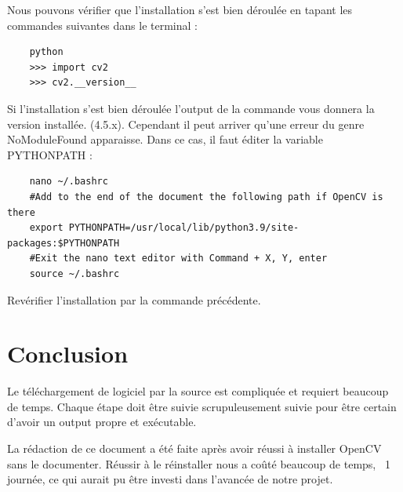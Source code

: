 \documentclass[
	a4paper,									%
	11pt,										%
	twoside,									%
	openright,									%
	notitlepage,									%
	parskip=half,								%
]{scrreprt}										%
\begin{document}
Nous pouvons vérifier que l'installation s'est bien déroulée en tapant les commandes suivantes dans le terminal : 

\begin{verbatim}
	python
	>>> import cv2
	>>> cv2.__version__
\end{verbatim}

Si l'installation s'est bien déroulée l'output de la commande vous donnera la version installée. (4.5.x). Cependant
il peut arriver qu'une erreur du genre NoModuleFound apparaisse. Dans ce cas, il faut éditer la variable PYTHONPATH : 

\begin{verbatim}
	nano ~/.bashrc
	#Add to the end of the document the following path if OpenCV is there
	export PYTHONPATH=/usr/local/lib/python3.9/site-packages:$PYTHONPATH
	#Exit the nano text editor with Command + X, Y, enter
	source ~/.bashrc
\end{verbatim}

Revérifier l'installation par la commande précédente.

\chapter{Conclusion}

Le téléchargement de logiciel par la source est compliquée et requiert beaucoup de temps. Chaque étape doit être
suivie scrupuleusement suivie pour être certain d'avoir un output propre et exécutable. \par

La rédaction de ce document a été faite après avoir réussi à installer OpenCV sans le documenter. 
Réussir à le réinstaller nous a coûté beaucoup de temps, ~1 journée, ce qui aurait pu être 
investi dans l'avancée de notre projet. 
\end{document}
